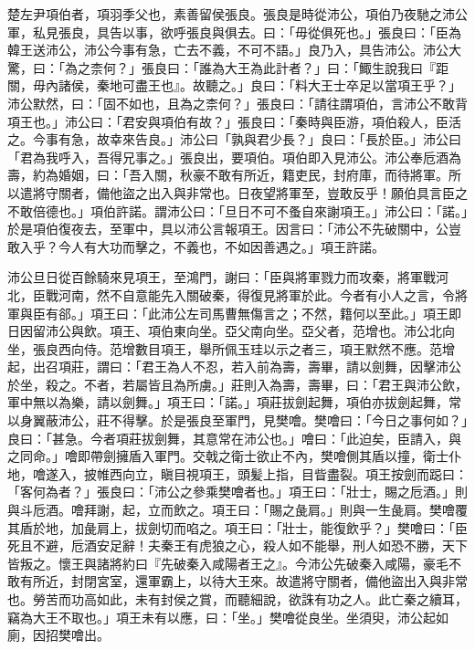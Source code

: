 \begin{pinyinscope}
楚左尹項伯者，項羽季父也，素善留侯張良。張良是時從沛公，項伯乃夜馳之沛公軍，私見張良，具告以事，欲呼張良與俱去。曰：「毋從俱死也。」張良曰：「臣為韓王送沛公，沛公今事有急，亡去不義，不可不語。」良乃入，具告沛公。沛公大驚，曰：「為之柰何？」張良曰：「誰為大王為此計者？」曰：「鯫生說我曰『距關，毋內諸侯，秦地可盡王也』。故聽之。」良曰：「料大王士卒足以當項王乎？」沛公默然，曰：「固不如也，且為之柰何？」張良曰：「請往謂項伯，言沛公不敢背項王也。」沛公曰：「君安與項伯有故？」張良曰：「秦時與臣游，項伯殺人，臣活之。今事有急，故幸來告良。」沛公曰「孰與君少長？」良曰：「長於臣。」沛公曰「君為我呼入，吾得兄事之。」張良出，要項伯。項伯即入見沛公。沛公奉卮酒為壽，約為婚姻，曰：「吾入關，秋豪不敢有所近，籍吏民，封府庫，而待將軍。所以遣將守關者，備他盜之出入與非常也。日夜望將軍至，豈敢反乎！願伯具言臣之不敢倍德也。」項伯許諾。謂沛公曰：「旦日不可不蚤自來謝項王。」沛公曰：「諾。」於是項伯復夜去，至軍中，具以沛公言報項王。因言曰：「沛公不先破關中，公豈敢入乎？今人有大功而擊之，不義也，不如因善遇之。」項王許諾。

沛公旦日從百餘騎來見項王，至鴻門，謝曰：「臣與將軍戮力而攻秦，將軍戰河北，臣戰河南，然不自意能先入關破秦，得復見將軍於此。今者有小人之言，令將軍與臣有郤。」項王曰：「此沛公左司馬曹無傷言之；不然，籍何以至此。」項王即日因留沛公與飲。項王、項伯東向坐。亞父南向坐。亞父者，范增也。沛公北向坐，張良西向侍。范增數目項王，舉所佩玉珪以示之者三，項王默然不應。范增起，出召項莊，謂曰：「君王為人不忍，若入前為壽，壽畢，請以劍舞，因擊沛公於坐，殺之。不者，若屬皆且為所虜。」莊則入為壽，壽畢，曰：「君王與沛公飲，軍中無以為樂，請以劍舞。」項王曰：「諾。」項莊拔劍起舞，項伯亦拔劍起舞，常以身翼蔽沛公，莊不得擊。於是張良至軍門，見樊噲。樊噲曰：「今日之事何如？」良曰：「甚急。今者項莊拔劍舞，其意常在沛公也。」噲曰：「此迫矣，臣請入，與之同命。」噲即帶劍擁盾入軍門。交戟之衛士欲止不內，樊噲側其盾以撞，衛士仆地，噲遂入，披帷西向立，瞋目視項王，頭髪上指，目眥盡裂。項王按劍而跽曰：「客何為者？」張良曰：「沛公之參乘樊噲者也。」項王曰：「壯士，賜之卮酒。」則與斗卮酒。噲拜謝，起，立而飲之。項王曰：「賜之彘肩。」則與一生彘肩。樊噲覆其盾於地，加彘肩上，拔劍切而啗之。項王曰：「壯士，能復飲乎？」樊噲曰：「臣死且不避，卮酒安足辭！夫秦王有虎狼之心，殺人如不能舉，刑人如恐不勝，天下皆叛之。懷王與諸將約曰『先破秦入咸陽者王之』。今沛公先破秦入咸陽，豪毛不敢有所近，封閉宮室，還軍霸上，以待大王來。故遣將守關者，備他盜出入與非常也。勞苦而功高如此，未有封侯之賞，而聽細說，欲誅有功之人。此亡秦之續耳，竊為大王不取也。」項王未有以應，曰：「坐。」樊噲從良坐。坐須臾，沛公起如廁，因招樊噲出。


\end{pinyinscope}
